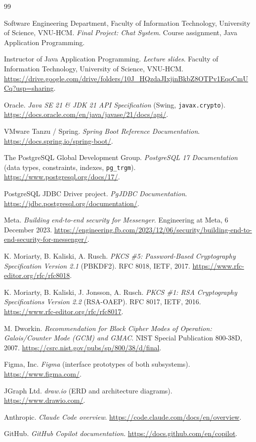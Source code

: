 \begin{thebibliography}{99}

Software Engineering Department, Faculty of Information Technology, University of
Science, VNU-HCM.
\textit{Final Project: Chat System}. Course assignment, Java Application
Programming.

Instructor of Java Application Programming.
\textit{Lecture slides}. Faculty of Information Technology, University of
Science, VNU-HCM.
\url{https://drive.google.com/drive/folders/10J_HQzdaJIxjinBkbZ8OTPv1EqoCmUCq?usp=sharing}.

Oracle.
\textit{Java SE 21 \& JDK 21 API Specification} (Swing, \texttt{javax.crypto}).
\url{https://docs.oracle.com/en/java/javase/21/docs/api/}.

VMware Tanzu / Spring.
\textit{Spring Boot Reference Documentation}.
\url{https://docs.spring.io/spring-boot/}.

The PostgreSQL Global Development Group.
\textit{PostgreSQL 17 Documentation} (data types, constraints, indexes,
\texttt{pg\_trgm}).
\url{https://www.postgresql.org/docs/17/}.

PostgreSQL JDBC Driver project.
\textit{PgJDBC Documentation}.
\url{https://jdbc.postgresql.org/documentation/}.

Meta.
\textit{Building end-to-end security for Messenger}. Engineering at Meta,
6 December 2023.
\url{https://engineering.fb.com/2023/12/06/security/building-end-to-end-security-for-messenger/}.

K. Moriarty, B. Kaliski, A. Rusch.
\textit{PKCS \#5: Password-Based Cryptography Specification Version 2.1}
(PBKDF2). RFC 8018, IETF, 2017.
\url{https://www.rfc-editor.org/rfc/rfc8018}.

K. Moriarty, B. Kaliski, J. Jonsson, A. Rusch.
\textit{PKCS \#1: RSA Cryptography Specifications Version 2.2} (RSA-OAEP).
RFC 8017, IETF, 2016.
\url{https://www.rfc-editor.org/rfc/rfc8017}.

M. Dworkin.
\textit{Recommendation for Block Cipher Modes of Operation: Galois/Counter Mode
(GCM) and GMAC}. NIST Special Publication 800-38D, 2007.
\url{https://csrc.nist.gov/pubs/sp/800/38/d/final}.

Figma, Inc.
\textit{Figma} (interface prototypes of both subsystems).
\url{https://www.figma.com/}.

JGraph Ltd.
\textit{draw.io} (ERD and architecture diagrams).
\url{https://www.drawio.com/}.

Anthropic.
\textit{Claude Code overview}.
\url{https://code.claude.com/docs/en/overview}.

GitHub.
\textit{GitHub Copilot documentation}.
\url{https://docs.github.com/en/copilot}.

\end{thebibliography}
\endgroup

